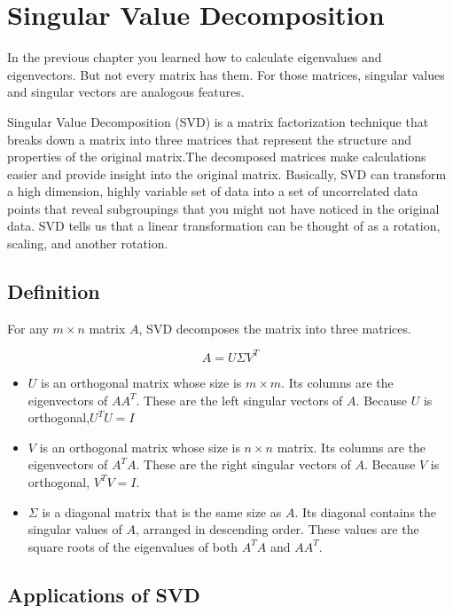 \chapter{Singular Value Decomposition}

In the previous chapter you learned how to calculate eigenvalues and eigenvectors. But not every matrix has them. For those matrices, singular values and singular vectors are analogous features. 

Singular Value Decomposition (SVD) is a matrix factorization technique that breaks down a matrix into three matrices that represent the structure and properties of the original matrix.The decomposed matrices make calculations easier and provide insight into the original matrix. Basically, SVD can transform a high dimension, highly variable set of data into a set of uncorrelated data points that reveal subgroupings that you might not have noticed in the original data. SVD tells us that a linear transformation can be thought of as a rotation, scaling, and another rotation.
 

\section{Definition}
For any $m \times n$ matrix $A$, SVD decomposes the matrix into three matrices.

\begin{equation}
A = U \Sigma V^T
\end{equation}

\begin{itemize}
\item $U$ is an orthogonal matrix whose size is $m \times m$. Its columns are the eigenvectors of $AA^T$. These are the left singular vectors of $A$. Because $U$ is orthogonal,$U^TU = I$
\item $V$ is an orthogonal matrix whose size is $n \times n$ matrix. Its columns are the eigenvectors of $A^TA$. These are the right singular vectors of $A$. Because $V$ is orthogonal, $V^TV = I$.
\item  $\Sigma$ is a diagonal matrix that is the same size as $A$. Its diagonal contains the singular values of $A$, arranged in descending order. These values are the square roots of the eigenvalues of both $A^TA$ and $AA^T$. 
\end{itemize}

\section{Applications of SVD}

